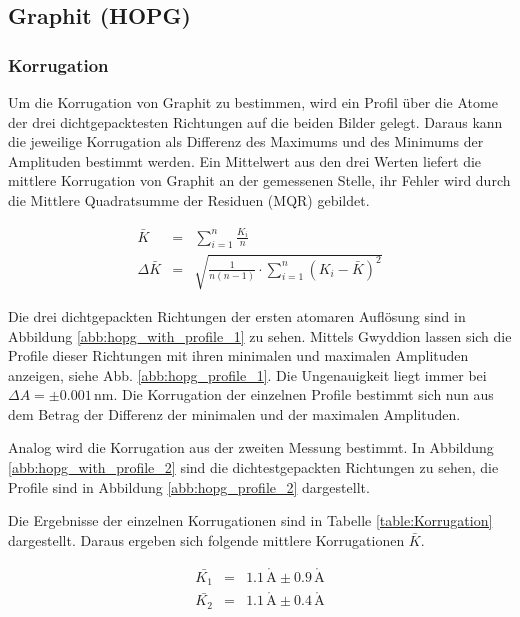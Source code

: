 \documentclass[12pt,a4paper]{scrartcl}
\numberwithin{equation}{section} %
\begin{document}
\newpage
\hypertarget{graphit-hopg}{%
\subsection{Graphit (HOPG)}\label{graphit-hopg}}

\hypertarget{korrugation}{%
\subsubsection{Korrugation}\label{korrugation}}

Um die Korrugation von Graphit zu bestimmen, wird ein Profil über die Atome der drei dichtgepacktesten Richtungen auf die beiden Bilder gelegt. Daraus kann die jeweilige Korrugation als Differenz des Maximums und des Minimums der Amplituden bestimmt werden. Ein Mittelwert aus den drei Werten liefert die mittlere Korrugation von Graphit an der gemessenen Stelle, ihr Fehler wird durch die Mittlere Quadratsumme der Residuen (MQR) gebildet.

\begin{eqnarray}
	\bar{K} &=& \sum_{i=1}^n \frac{K_i}{n} \\
	\Delta \bar{K} &=& \sqrt{\frac{1}{n (n-1)} \cdot \sum_{i=1}^{n} (K_i -\bar{K})^2}
\end{eqnarray}

\noindent
Die drei dichtgepackten Richtungen der ersten atomaren Auflösung sind in Abbildung \ref{abb:hopg_with_profile_1} zu sehen. Mittels Gwyddion \cite{Gwyddion} lassen sich die Profile dieser Richtungen mit ihren minimalen und maximalen Amplituden anzeigen, siehe Abb. \ref{abb:hopg_profile_1}. Die Ungenauigkeit liegt immer bei $\Delta A = \pm 0.001 \mathrm{\,nm}$. Die Korrugation der einzelnen Profile bestimmt sich nun aus dem Betrag der Differenz der minimalen und der maximalen Amplituden.

Analog wird die Korrugation aus der zweiten Messung bestimmt. In Abbildung \ref{abb:hopg_with_profile_2} sind die dichtestgepackten Richtungen zu sehen, die Profile sind in Abbildung \ref{abb:hopg_profile_2} dargestellt.

Die Ergebnisse der einzelnen Korrugationen sind in Tabelle \ref{table:Korrugation} dargestellt. Daraus ergeben sich folgende mittlere Korrugationen $\bar{K}$.

\begin{eqnarray}
	\bar{K_1} &=& 1.1 \mathrm{\,\mathring{A}} \pm 0.9 \mathrm{\,\mathring{A}} \\
	\bar{K_2} &=& 1.1 \mathrm{\,\mathring{A}} \pm 0.4 \mathrm{\,\mathring{A}}
\end{eqnarray}
\end{document}
